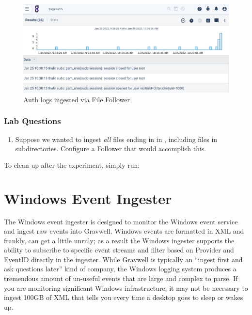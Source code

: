 \begin{figure}
	\includegraphics{images/igst-filefollow-lab.png}
	\caption{Auth logs ingested via File Follower}
	\label{fig:file-follow-lab}
\end{figure}

\subsubsection{Lab Questions}

\begin{enumerate}
\item
  Suppose we wanted to ingest \emph{all} files ending in  in
  , including files in subdirectories. Configure a Follower that
  would accomplish this.
\end{enumerate}

To clean up after the experiment, simply run:


\clearpage

\section{Windows Event Ingester}
The Windows event ingester is designed to monitor the Windows event
service and ingest raw events into Gravwell. Windows events are
formatted in XML and frankly, can get a little unruly; as a result the
Windows ingester supports the ability to subscribe to specific event
streams and filter based on Provider and EventID directly in the
ingester. While Gravwell is typically an ``ingest first and ask
questions later'' kind of company, the Windows logging system produces a
tremendous amount of un-useful events that are large and complex to
parse. If you are monitoring significant Windows infrastructure, it may
not be necessary to ingest 100GB of XML that tells you every time a
desktop goes to sleep or wakes up.

